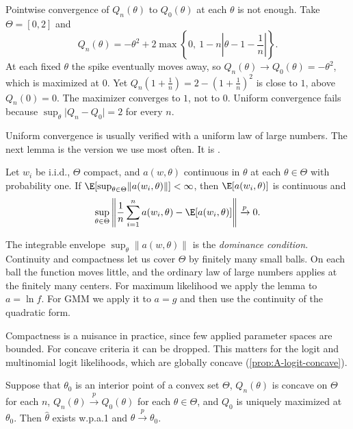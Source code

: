 Pointwise convergence of $Q_n(\theta)$ to $Q_0(\theta)$ at each $\theta$ is not enough. Take $\Theta = [0, 2]$ and
\begin{equation*}
  Q_n(\theta) = -\theta^2 + 2\max\left\{0,\ 1 - n\left\lvert\theta - 1 - \frac{1}{n}\right\rvert\right\}.
\end{equation*}
At each fixed $\theta$ the spike eventually moves away, so $Q_n(\theta) \to Q_0(\theta) = -\theta^2$, which is maximized at
$0$. Yet $Q_n(1 + \frac{1}{n}) = 2 - (1 + \frac{1}{n})^2$ is close to $1$, above $Q_n(0) = 0$. The maximizer converges to
$1$, not to $0$. Uniform convergence fails because $\sup_\theta\lvert Q_n - Q_0\rvert = 2$ for every $n$.

Uniform convergence is usually verified with a uniform law of large numbers. The next lemma is the version we use most
often. It is \citet[Lemma 2.4]{NeweyMcFadden1994}.

\begin{lemma}\label{lem:A-ulln}
Let $w_i$ be i.i.d., $\Theta$ compact, and $a(w, \theta)$ continuous in $\theta$ at each $\theta \in \Theta$ with
probability one. If $\E[\sup_{\theta \in \Theta}\lVert a(w_i, \theta)\rVert] < \infty$, then $\E[a(w_i, \theta)]$ is
continuous and
\begin{equation*}
  \sup_{\theta \in \Theta}\left\lVert\frac{1}{n}\sum_{i=1}^n a(w_i, \theta) - \E[a(w_i, \theta)]\right\rVert
  \xrightarrow{p} 0.
\end{equation*}
\end{lemma}

The integrable envelope $\sup_\theta\lVert a(w, \theta)\rVert$ is the \emph{dominance condition}. Continuity and compactness
let us cover $\Theta$ by finitely many small balls. On each ball the function moves little, and the ordinary law of large
numbers applies at the finitely many centers. For maximum likelihood we apply the lemma to $a = \ln f$. For GMM we apply
it to $a = g$ and then use the continuity of the quadratic form.

Compactness is a nuisance in practice, since few applied parameter spaces are bounded. For concave criteria it can be
dropped. This matters for the logit and multinomial logit likelihoods, which are globally concave
(\cref{prop:A-logit-concave}).

\begin{theorem}\label{thm:A-concave}
Suppose that $\theta_0$ is an interior point of a convex set $\Theta$, $Q_n(\theta)$ is concave on $\Theta$ for each $n$,
$Q_n(\theta) \xrightarrow{p} Q_0(\theta)$ for each $\theta \in \Theta$, and $Q_0$ is uniquely maximized at $\theta_0$. Then
$\hat\theta$ exists w.p.a.1 and $\hat\theta \xrightarrow{p} \theta_0$.
\end{theorem}

